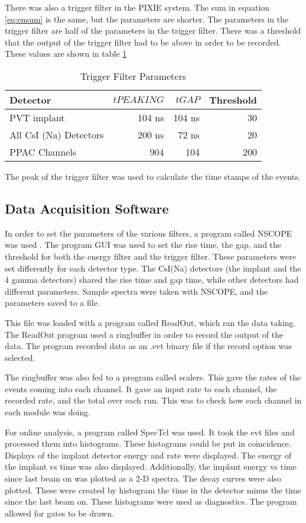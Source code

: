 \documentclass[../MaxHughesThesis.tex]{subfiles}
\begin{document}
There was also a trigger filter in the PIXIE system.
The sum in equation \ref{eq:ensum} is the same, but the parameters are shorter.
The parameters in the trigger filter are half of the parameters in the trigger filter.
There was a threshold that the output of the trigger filter had to be above in order to be recorded.
These values are shown in table \ref{tab:trigfilter}

%
\begin{table}[!hbt]
	\centering
	\caption{Trigger Filter Parameters}
		\begin{tabular}{lrrr}
		Detector & $tPEAKING$ & $tGAP$ & Threshold\\ \hline
		PVT implant & 104 ns & 104 ns & 30 \\ 
		All CsI (Na) Detectors & 200 ns & 72 ns & 20 \\
		PPAC Channels & 904 & 104 & 200 
		\end{tabular}	
		\label{tab:trigfilter}
\end{table}
%

The peak of the trigger filter was used to calculate the time stamps of the events.  

\subsection{Data Acquisition Software}
In order to set the parameters of the various filters, a program called NSCOPE was used \cite{DAQ17}.
The program GUI was used to set the rise time, the gap, and the threshold for both the energy filter and the trigger filter.
These parameters were set differently for each detector type.
The CsI(Na) detectors (the implant and the 4 gamma detectors) shared the rise time and gap time, while other detectors had different parameters.
Sample spectra were taken with NSCOPE, and the parameters saved to a file.

This file was loaded with a program called ReadOut, which ran the data taking.
The ReadOut program used a ringbuffer in order to record the output of the data.
The program recorded data as an .evt binary file if the record option was selected.

The ringbuffer was also fed to a program called scalers.
This gave the rates of the events coming into each channel.
It gave an input rate to each channel, the recorded rate, and the total over each run.
This was to check how each channel in each module was doing.

For online analysis, a program called SpecTcl was used.
It took the evt files and processed them into histograms.
These histograms could be put in coincidence.
Displays of the implant detector energy and rate were displayed.
The energy of the implant vs time was also displayed.
Additionally, the implant energy vs time since last beam on was plotted as a 2-D spectra.
The decay curves were also plotted.
These were created by histogram the time in the detector minus the time since the last beam on.
These histograms were used as diagnostics. 
The program allowed for gates to be drawn.
\end{document}
